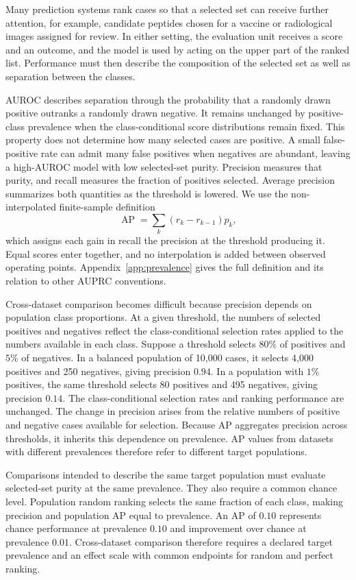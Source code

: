 \documentclass[11pt]{article}
\newcommand{\AP}{\operatorname{AP}}
\theoremstyle{remark}
\begin{document}
Many prediction systems rank cases so that a selected set can receive further attention, for example, candidate peptides chosen for a vaccine or radiological images assigned for review. In either setting, the evaluation unit receives a score and an outcome, and the model is used by acting on the upper part of the ranked list. Performance must then describe the composition of the selected set as well as separation between the classes.

AUROC describes separation through the probability that a randomly drawn positive outranks a randomly drawn negative. It remains unchanged by positive-class prevalence when the class-conditional score distributions remain fixed. This property does not determine how many selected cases are positive. A small false-positive rate can admit many false positives when negatives are abundant, leaving a high-AUROC model with low selected-set purity. Precision measures that purity, and recall measures the fraction of positives selected. Average precision summarizes both quantities as the threshold is lowered. We use the non-interpolated finite-sample definition
\[
\AP
=
\sum_k (r_k-r_{k-1})p_k,
\]
which assigns each gain in recall the precision at the threshold producing it. Equal scores enter together, and no interpolation is added between observed operating points. Appendix~\ref{app:prevalence} gives the full definition and its relation to other AUPRC conventions.

Cross-dataset comparison becomes difficult because precision depends on population class proportions. At a given threshold, the numbers of selected positives and negatives reflect the class-conditional selection rates applied to the numbers available in each class. Suppose a threshold selects $80\%$ of positives and $5\%$ of negatives. In a balanced population of 10,000 cases, it selects 4,000 positives and 250 negatives, giving precision $0.94$. In a population with $1\%$ positives, the same threshold selects 80 positives and 495 negatives, giving precision $0.14$. The class-conditional selection rates and ranking performance are unchanged. The change in precision arises from the relative numbers of positive and negative cases available for selection. Because AP aggregates precision across thresholds, it inherits this dependence on prevalence. AP values from datasets with different prevalences therefore refer to different target populations.

Comparisons intended to describe the same target population must evaluate selected-set purity at the same prevalence. They also require a common chance level. Population random ranking selects the same fraction of each class, making precision and population AP equal to prevalence. An AP of $0.10$ represents chance performance at prevalence $0.10$ and improvement over chance at prevalence $0.01$. Cross-dataset comparison therefore requires a declared target prevalence and an effect scale with common endpoints for random and perfect ranking.
\end{document}
